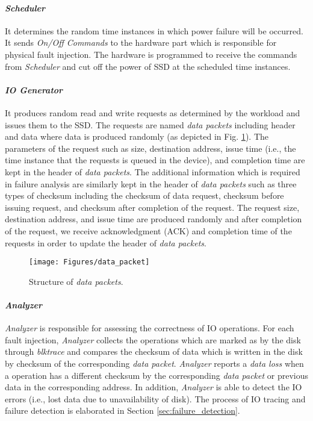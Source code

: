 	\paragraph{\emph{Scheduler}}
	It determines the random time instances in which power failure will be occurred. It sends \emph{On/Off Commands} to the hardware part which is responsible for physical fault injection. The hardware is programmed to receive the commands from \emph{Scheduler} and cut off the power of SSD at the scheduled time instances.
	\paragraph{\emph{IO Generator}}
	It produces random read and write requests as determined by the workload and issues them to the SSD. The requests are named \emph{data packets} including header and data where data is produced randomly (as depicted in Fig. \ref{fig:data_packet}). The parameters of the request such as size, destination address, issue time (i.e., the time instance that the requests is queued in the device), and completion time are kept in the header of \emph{data packets}. 
	The additional information which is required in failure analysis are similarly kept in the header of \emph{data packets} such as three types of checksum including the checksum of data request, checksum before issuing request, and checksum after completion of the request.
	The request size, destination address, and issue time are produced randomly and after completion of the request, we receive acknowledgment (ACK) and completion time of the requests in order to update the header of \emph{data packets}. 
	\begin{figure}[!t]
		\centering
		\texttt{[image: Figures/data\_packet]}
		\vspace{-0.5em}
		\caption{Structure of \emph{data packets}.}
		\vspace{-2em}
		\label{fig:data_packet}
	\end{figure}
	\paragraph{\emph{Analyzer}}
	 \emph{Analyzer} is responsible for assessing the correctness of IO operations. For each fault injection, \emph{Analyzer} collects the operations which are marked as  by the disk through \emph{blktrace} and compares the checksum of data which is written in the disk by checksum of the corresponding \emph{data packet}. \emph{Analyzer} reports a \emph{data loss} when a  operation has a different checksum by the corresponding \emph{data packet} or previous data in the corresponding address. In addition, \emph{Analyzer} is able to detect the IO errors (i.e., lost data due to unavailability of disk).
	The process of IO tracing and failure detection is elaborated in Section \ref{sec:failure_detection}.
